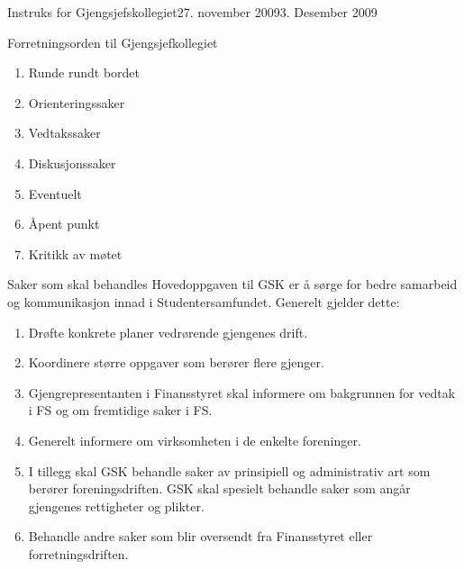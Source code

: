 \begin{instruks}{Instruks for Gjengsjefskollegiet}{27. november 2009}{3. Desember 2009}
\begin{instruksledd}{Forretningsorden til Gjengsjefkollegiet}
\begin{enumerate}
\begin{enumerate}
\begin{enumerate}
                            \item Runde rundt bordet
                            \item Orienteringssaker
                            \item Vedtakssaker
                            \item Diskusjonssaker
                            \item Eventuelt
                            \item Åpent punkt
                            \item Kritikk av møtet
                        \end{enumerate}
                \end{enumerate}
        \end{enumerate}
    \end{instruksledd}

    \begin{instruksledd}{Saker som skal behandles}
        Hovedoppgaven til GSK er å sørge for bedre samarbeid og kommunikasjon innad i
        Studentersamfundet. Generelt
        gjelder dette:
        \begin{enumerate}
            \item Drøfte konkrete planer vedrørende gjengenes drift.
            \item Koordinere større oppgaver som berører flere gjenger.
            \item Gjengrepresentanten i Finansstyret skal informere om bakgrunnen for
                vedtak i FS og om fremtidige saker i FS.
            \item Generelt informere om virksomheten i de enkelte foreninger.
            \item I tillegg skal GSK behandle saker av prinsipiell og administrativ art
                som berører foreningsdriften. GSK skal
                spesielt behandle saker som angår gjengenes rettigheter og plikter.
            \item Behandle andre saker som blir oversendt fra Finansstyret eller
                forretningsdriften.
        \end{enumerate}

    \end{instruksledd}
\end{instruks}







